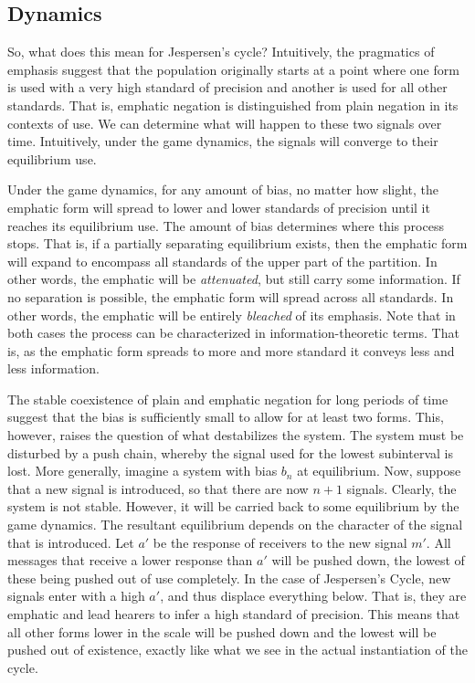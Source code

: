 \documentclass[12pt]{article}
\theoremstyle{definition} \newtheorem{definition}{Definition}
\begin{document}
\subsection{Dynamics}

So, what does this mean for Jespersen's cycle? Intuitively, the pragmatics of emphasis suggest that the population originally starts at a point where one form is used with a  very high standard of precision and another is used for all other standards. That is, emphatic negation is distinguished from plain negation in its contexts of use. We can determine what will happen to these two signals over time. Intuitively, under the game dynamics, the signals will converge to their equilibrium use.

Under the game dynamics, for any amount of bias, no matter how slight, the emphatic form will spread to lower and lower standards of precision until it reaches its equilibrium use. The amount of bias determines where this process stops. That is, if a partially separating equilibrium exists, then the emphatic form will expand to encompass all standards of the upper part of the partition. In other words, the emphatic will be \emph{attenuated}, but still carry some information.  If no separation is possible, the emphatic form will spread across all standards. In other words, the emphatic will be entirely \emph{bleached} of its emphasis. Note that in both cases the process can be characterized in information-theoretic terms. That is, as the emphatic form spreads to more and more standard it conveys less and less information. 

The stable coexistence of plain and emphatic negation for long periods of time suggest that the bias is sufficiently small to allow for at least two forms. This, however, raises the question of what destabilizes the system. The system must be disturbed by a push chain, whereby the signal used for the lowest subinterval is lost. More generally, imagine a system with bias $b_n$ at equilibrium. Now, suppose that a new signal is introduced, so that there are now $n+1$ signals. Clearly, the system is not stable. However, it will be carried back to some equilibrium by the game dynamics. The resultant equilibrium depends on the character of the signal that is introduced. Let $a'$ be the response of receivers to the new signal $m'$. All messages that receive a lower response than $a'$ will be pushed down, the lowest of these being pushed out of use completely.  In the case of Jespersen's Cycle, new signals enter with a high $a'$, and thus displace everything below. That is, they are emphatic and lead hearers to 
infer a high standard of precision. This means that all other forms lower in the scale will be pushed down and the lowest will be pushed out of existence, exactly like what we see in the actual instantiation of the cycle.
\end{document}
